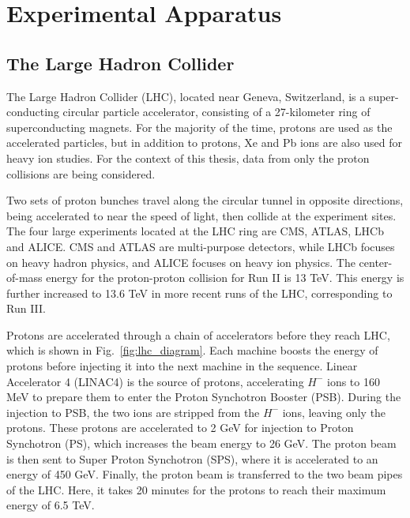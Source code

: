 \chapter{Experimental Apparatus}
\label{chap:apparatus}

\graphicspath{{2_Experimental_Apparatus/Figures/}}

\section{The Large Hadron Collider}
\label{sec:large_had_collider}

The Large Hadron Collider (LHC), located near Geneva, Switzerland, is a super-conducting circular particle accelerator, 
consisting of a 27-kilometer ring of superconducting magnets. For the majority of the time, protons are used as the accelerated
particles, but in addition to protons, Xe and Pb ions are also used for heavy ion studies. For the context of this thesis, data
from only the proton collisions are being considered.

Two sets of proton bunches travel along the circular tunnel in opposite directions, being accelerated to near the speed of light,
then collide at the experiment sites. The four large experiments located at the LHC ring are CMS, ATLAS, LHCb and ALICE. CMS and ATLAS
are multi-purpose detectors, while LHCb focuses on heavy hadron physics, and ALICE focuses on heavy ion physics. The center-of-mass energy 
for the proton-proton collision for Run II is 13 TeV. This energy is further increased to 13.6 TeV in 
more recent runs of the LHC, corresponding to Run III. 

Protons are accelerated through a chain of accelerators before they reach LHC, which is shown in Fig.~\ref{fig:lhc_diagram}.
Each machine boosts the energy of protons before injecting it into the next machine in the sequence. Linear Accelerator 4 (LINAC4)
is the source of protons, accelerating $H^{-}$ ions to 160 MeV to prepare them to enter the Proton Synchotron Booster (PSB). During the injection
to PSB, the two ions are stripped from the $H^{-}$ ions, leaving only the protons. These protons are accelerated to 2 GeV for injection to Proton 
Synchotron (PS), which increases the beam energy to 26 GeV. The proton beam is then sent to Super Proton Synchotron (SPS), where it is accelerated
to an energy of 450 GeV. Finally, the proton beam is transferred to the two beam pipes of the LHC. Here, it takes 20 minutes for the protons to reach
their maximum energy of 6.5 TeV. 

